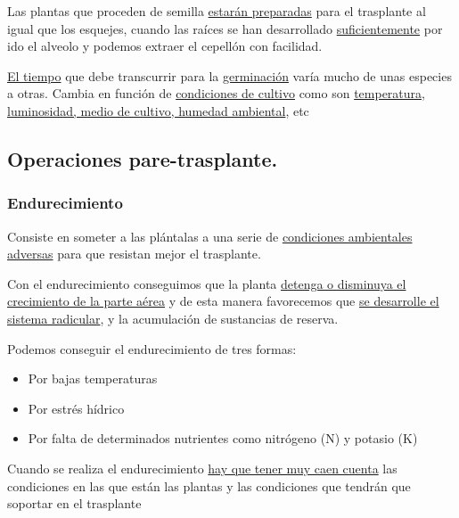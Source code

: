 \documentclass[a4paper,12pt,oneside]{article}
\begin{document}
Las plantas que proceden de semilla \uline{estarán preparadas} para el trasplante al
igual que los esquejes, cuando las raíces se han desarrollado \uline{suficientemente}
por ido el alveolo y podemos extraer el cepellón con facilidad. 

\uline{El tiempo} que debe transcurrir para la \uline{germinación} varía mucho de unas
especies a otras. Cambia en función de \uline{condiciones de cultivo} como son
\uline{temperatura, luminosidad, medio de cultivo, humedad ambiental}, etc
\subsection{Operaciones pare-trasplante.}
\label{sec:org9a34781}
\subsubsection{Endurecimiento}
\label{sec:org7e2b099}
Consiste en someter a las plántalas a una serie de \uline{condiciones ambientales
adversas} para que resistan  mejor el trasplante.

Con el  endurecimiento conseguimos que la planta \uline{detenga o disminuya el
crecimiento de la parte aérea} y de esta manera favorecemos que \uline{se desarrolle
el sistema radicular}, y la acumulación de sustancias de reserva. 

Podemos conseguir el endurecimiento de tres formas:
\begin{itemize}
\item Por bajas temperaturas
\item Por estrés hídrico
\item Por falta de determinados nutrientes como nitrógeno (N) y potasio (K)
\end{itemize}

Cuando se realiza el endurecimiento \uline{hay que tener muy caen cuenta} las
condiciones en las que están las plantas y las condiciones que tendrán que
soportar en el trasplante
\end{document}
